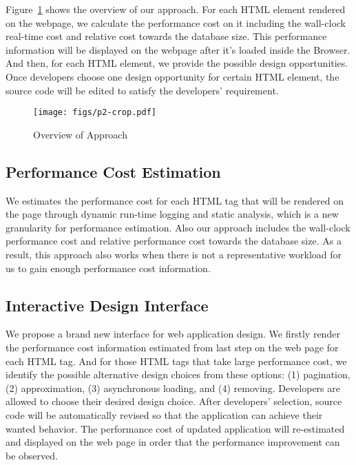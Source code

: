 
\label{sec:app}
Figure~\ref{fig:app} shows the overview of our approach.
For each HTML element rendered on the webpage, we calculate the performance cost on it including the wall-clock real-time cost and relative cost towards the database size. This performance information will be displayed on the webpage after it's loaded inside the Browser. And then, for each HTML element, we provide the possible design opportunities. Once developers choose one design opportunity for certain HTML element, the source code will be edited to satisfy the developers' requirement.
\begin{figure}[H]
\texttt{[image: figs/p2-crop.pdf]}
\caption{Overview of Approach}
\label{fig:app}
\end{figure}
\subsection{Performance Cost Estimation}
We estimates the performance cost for each HTML tag that will be rendered on the page through dynamic run-time logging and static analysis, which is a new granularity for performance estimation. Also our approach includes the wall-clock performance cost and relative performance cost towards the database size. As a result, this approach also works when there is not a representative workload for us to gain enough performance cost information. 
 
\subsection{Interactive Design Interface}
We propose a brand new interface for web application design. We firstly render the performance cost information estimated from last step on the web page for each HTML tag. And for those HTML tags that take large performance cost, we identify the possible alternative design choices from these options: (1) pagination, (2) approximation, (3) asynchronous loading, and (4) removing. Developers are allowed to choose their desired design choice. After developers' selection, source code will be automatically revised so that the application can achieve their wanted behavior. The performance cost of updated application will re-estimated and displayed on the web page in order that the performance improvement can be observed. 




